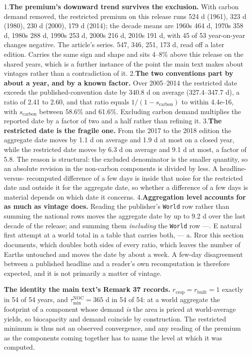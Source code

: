 \documentclass[11pt]{article}
\begin{document}
1.\textbf{The premium's downward trend survives the exclusion.} With carbon demand removed, the restricted premium on this release runs 524 d (1961), 323 d (1980), 230 d (2000), 179 d (2014); the decade means are 1960s 464 d, 1970s 358 d, 1980s 288 d, 1990s 253 d, 2000s 216 d, 2010s 191 d, with 45 of 53 year-on-year changes negative. The article's series. 547, 346, 251, 173 d, read off a later edition. Carries the same sign and shape and sits 4--8\% above this release on the shared years, which is a further instance of the point the main text makes about vintages rather than a contradiction of it. 2.\textbf{The two conventions part by about a year, and by a known factor.} Over 2005--2014 the restricted date exceeds the published-convention date by 340.8 d on average (327.4--347.7 d), a ratio of 2.41 to 2.60, and that ratio equals \(1/(1-s_{\mathrm{carbon}})\) to within 4.4e-16, with \(s_{\mathrm{carbon}}\) between 58.6\% and 61.6\%. Excluding carbon demand multiplies the reported date by a factor of two and a half rather than refining it. 3.\textbf{The restricted date is the fragile one.} From the 2017 to the 2018 edition the aggregate date moves by 1.1 d on average and 1.9 d at most on a closed year, while the restricted date moves by 6.3 d on average and 9.1 d at most, a factor of 5.8. The reason is structural: the excluded denominator is the smaller quantity, so an absolute revision in the non-carbon components is divided by less. A headline-versus- recomputed difference of a few days is inside that noise for the restricted date and outside it for the aggregate date, so whether a difference of a few days is material depends on which date it concerns. 4.\textbf{Aggregation level accounts for as much as vintage does.} Reading the publisher's \texttt{World} row rather than summing the national rows moves the aggregate date by up to 9.2 d over the last decade of the release; and summing them \emph{including} the \texttt{World} row ---. E natural first attempt at a world total in a table that carries both, --- a. Rror this section documents, which doubles both sides of every ratio, which leaves the number of Earths untouched and moves the date by about a week. A few-day disagreement between a published headline and a reader's own recomputation is therefore expected, and it is not primarily a matter of vintage.

\textbf{The identity the main text's Remark 37 records.} \(r_{\mathrm{crop}} = r_{\mathrm{built}} = 1\) exactly in 54 of 54 years, and \(\tau_{\min}^{\mathrm{NOC}} = 365\) d in 54 of 54: at a world aggregate the footprint of a component whose demand \emph{is} the area is priced at world-average yields, so biocapacity and demand coincide by construction. The restricted minimum is thus not an observed convergence, and any reading of the premium as the components coming together has to name the level at which it was computed.
\end{document}
